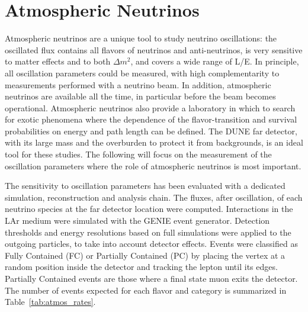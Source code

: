 \section{Atmospheric Neutrinos}
\label{sec:physics-atmpdk-atmnu}

Atmospheric neutrinos are a unique tool to study neutrino oscillations: the 
oscillated flux contains all flavors of neutrinos and anti-neutrinos, is very sensitive to 
matter effects and to both $\Delta m^2$, and covers a wide range of L/E. In principle, 
all oscillation parameters could be measured, with high complementarity to 
measurements performed with a neutrino beam. In addition, atmospheric 
neutrinos are available all the time, in particular before the beam becomes 
operational. Atmospheric neutrinos also provide a laboratory in which to search 
for exotic phenomena where the dependence of the flavor-transition and survival 
probabilities on energy and path length can be defined. The DUNE far detector, 
with its large mass and the overburden to protect it from backgrounds, is an 
ideal tool for these studies. The following will focus on the 
measurement of the oscillation parameters where the role of atmospheric neutrinos is 
most important. 

The sensitivity to oscillation parameters has been evaluated with a 
dedicated simulation, reconstruction and analysis chain. 
The fluxes, after 
oscillation, of each neutrino species at the far detector location were 
computed. Interactions in the LAr medium were simulated with the GENIE event 
generator. Detection thresholds and energy resolutions based on full 
simulations were applied to the outgoing particles, to take into account 
detector effects. Events were classified as Fully Contained (FC) or 
Partially Contained (PC) by placing the vertex at a random position inside the 
detector and tracking the lepton until its edges.  Partially Contained events 
are those where a final state muon exits the detector.  The number of events expected 
for each flavor and category is summarized in Table~\ref{tab:atmos_rates}.

%
\begin{table}[!htbp]
\caption[Atmospheric-neutrino event rates]
        {
         Atmospheric-neutrino event rates including oscillations in \SI{350}{\ktyr} 
         with a LArTPC, fully or partially contained in the detector fiducial volume. 
        }
\begin{center}
\end{center}
\label{tab:atmos_rates}
\end{table}
%

